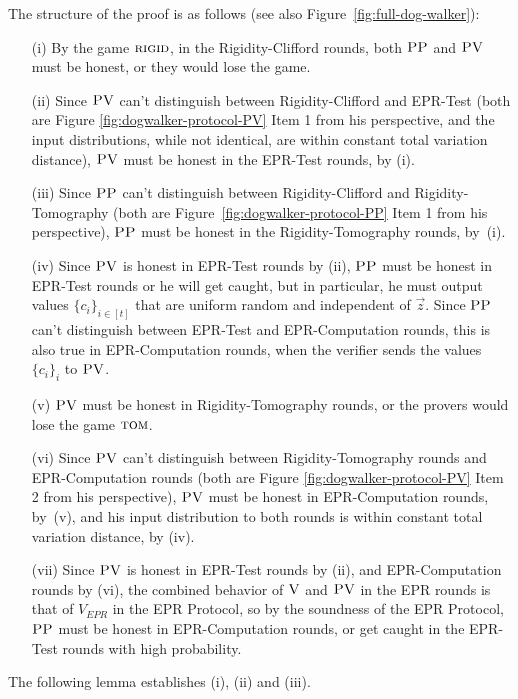 \documentclass[11pt]{article}
\theoremstyle{remark}
\theoremstyle{definition}
\newcommand{\rigid}{\textsc{rigid}}
\newcommand{\tom}{\textsc{tom}}
\newcommand{\ver}{\textsc{V}}
\newcommand{\pv}{\textsc{PV}}
\newcommand{\pp}{\textsc{PP}}
\begin{document}
\noindent The structure of the proof is as follows (see also Figure~\ref{fig:full-dog-walker}):
\begin{enumerate}
\item[(i)] By the game $\rigid$, in the Rigidity-Clifford rounds, both $\pp$ and $\pv$ must be honest, or they would lose the game.
\item[(ii)] Since $\pv$ can't distinguish between Rigidity-Clifford and EPR-Test (both are Figure \ref{fig:dogwalker-protocol-PV} Item 1 from his perspective, and the input distributions, while not identical, are within constant total variation distance), $\pv$ must be honest in the EPR-Test rounds, by (i). 
\item[(iii)] Since $\pp$ can't distinguish between Rigidity-Clifford and Rigidity-Tomography (both are Figure~\ref{fig:dogwalker-protocol-PP} Item 1 from his perspective), $\pp$ must be honest in the Rigidity-Tomography rounds, by~(i). 
\item[(iv)] Since $\pv$ is honest in EPR-Test rounds by (ii), $\pp$ must be honest in EPR-Test rounds or he will get caught, but in particular, he must output values $\{c_i\}_{i\in [t]}$ that are uniform random and independent of $\vec{z}$. Since $\pp$ can't distinguish between EPR-Test and EPR-Computation rounds, this is also true in EPR-Computation rounds, when the verifier sends the values $\{c_i\}_i$ to $\pv$. 
\item[(v)] $\pv$ must be honest in Rigidity-Tomography rounds, or the provers would lose the game $\tom$.
\item[(vi)] Since $\pv$ can't distinguish between Rigidity-Tomography rounds and EPR-Computation rounds (both are Figure \ref{fig:dogwalker-protocol-PV} Item 2 from his perspective), $\pv$ must be honest in EPR-Computation rounds, by~(v), and his input distribution to both rounds is within constant total variation distance, by (iv).
\item[(vii)] Since $\pv$ is honest in EPR-Test rounds by (ii), and EPR-Computation rounds by (vi), the combined behavior of $\ver$ and $\pv$ in the EPR rounds is that of $V_{EPR}$ in the EPR Protocol, so
by the soundness of the EPR Protocol, $\pp$ must be honest in EPR-Computation rounds, or get caught in the EPR-Test rounds with high probability.
\end{enumerate}

 The following lemma establishes (i), (ii) and (iii). 
\end{document}
